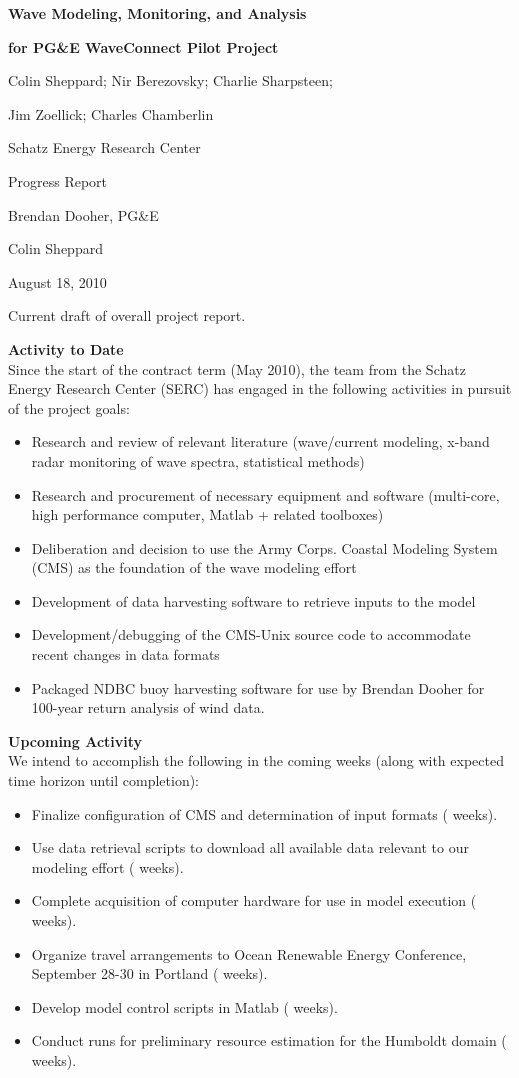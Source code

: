 \documentclass[11pt,letterpaper,oneside,reqno]{article}
\begin{document}
\centerline{\Large \bf Wave Modeling, Monitoring, and Analysis} 
\centerline{\Large \bf for PG\&E WaveConnect Pilot Project}
\centerline{Colin Sheppard; Nir Berezovsky; Charlie Sharpsteen;}
\centerline{Jim Zoellick; Charles Chamberlin}
\centerline{Schatz Energy Research Center}
\bigskip
\bigskip

 Progress Report

 Brendan Dooher, PG\&E

 Colin Sheppard

 August 18, 2010 

 Current draft of overall project report.

\textbf{Activity to Date}\\
Since the start of the contract term (May 2010), the team from the Schatz Energy Research Center (SERC) has engaged in the following activities in pursuit of the project goals:
\begin{itemize}
\item Research and review of relevant literature (wave/current modeling, x-band radar monitoring of wave spectra, statistical methods) 
\item Research and procurement of necessary equipment and software (multi-core, high performance computer, Matlab + related toolboxes)
\item Deliberation and decision to use the Army Corps. Coastal Modeling System (CMS) as the foundation of the wave modeling effort
\item Development of data harvesting software to retrieve inputs to the model
\item Development/debugging of the CMS-Unix source code to accommodate recent changes in data formats 
\item Packaged NDBC buoy harvesting software for use by Brendan Dooher for 100-year return analysis of wind data.
\end{itemize}

\textbf{Upcoming Activity}\\
We intend to accomplish the following in the coming weeks (along with expected time horizon until completion):
\begin{itemize}
\item Finalize configuration of CMS and determination of input formats ( weeks).
\item Use data retrieval scripts to download all available data relevant to our modeling effort ( weeks).
\item Complete acquisition of computer hardware for use in model execution ( weeks).
\item Organize travel arrangements to Ocean Renewable Energy Conference, September 28-30 in Portland ( weeks).
\item Develop model control scripts in Matlab ( weeks).
\item Conduct runs for preliminary resource estimation for the Humboldt domain ( weeks).
\end{itemize}
\end{document}
